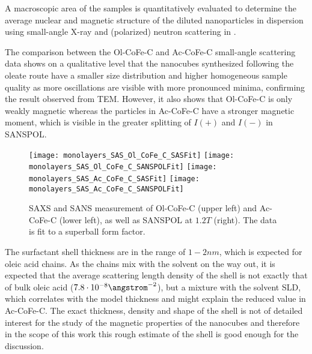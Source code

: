 \documentclass[\main/dresen_thesis.tex]{subfiles}
\renewcommand{\thisPath}{\main/chapters/monolayers/nanoparticles/discussion}
\begin{document}
  \label{sec:monolayers:nanoparticle:structuralCharacterization}

    
      \FloatBarrier

    
      \FloatBarrier

    A macroscopic area of the samples is quantitatively evaluated to determine the average nuclear and magnetic structure of the diluted nanoparticles in dispersion using small-angle X-ray and (polarized) neutron scattering in .

    The comparison between the Ol-CoFe-C and Ac-CoFe-C small-angle scattering data shows on a qualitative level that the nanocubes synthesized following the oleate route have a smaller size distribution and higher homogeneous sample quality as more oscillations are visible with more pronounced minima, confirming the result observed from TEM.
    However, it also shows that Ol-CoFe-C is only weakly magnetic whereas the particles in Ac-CoFe-C have a stronger magnetic moment, which is visible in the greater splitting of $I(+)$ and $I(-)$ in SANSPOL.
    
    \begin{figure}[tb]
      \centering
      \texttt{[image: monolayers\_SAS\_Ol\_CoFe\_C\_SASFit]}
      \texttt{[image: monolayers\_SAS\_Ol\_CoFe\_C\_SANSPOLFit]}
      \texttt{[image: monolayers\_SAS\_Ac\_CoFe\_C\_SASFit]}
      \texttt{[image: monolayers\_SAS\_Ac\_CoFe\_C\_SANSPOLFit]}
      \caption{\label{fig:monolayers:nanoparticle:sas:AcOlCoFeC}SAXS and SANS measurement of Ol-CoFe-C (upper left) and Ac-CoFe-C (lower left), as well as SANSPOL at $1.2 \unit{T}$ (right). The data is fit to a superball form factor.}
    \end{figure}

    The surfactant shell thickness are in the range of $1 - 2 \unit{nm}$, which is expected for oleic acid chains.
    As the chains mix with the solvent on the way out, it is expected that the average scattering length density of the shell is not exactly that of bulk oleic acid ($7.8 \cdot 10^{-8} \angstrom^{-2}$), but a mixture with the solvent SLD, which correlates with the model thickness and might explain the reduced value in Ac-CoFe-C.
    The exact thickness, density and shape of the shell is not of detailed interest for the study of the magnetic properties of the nanocubes and therefore in the scope of this work this rough estimate of the shell is good enough for the discussion.
\end{document}

